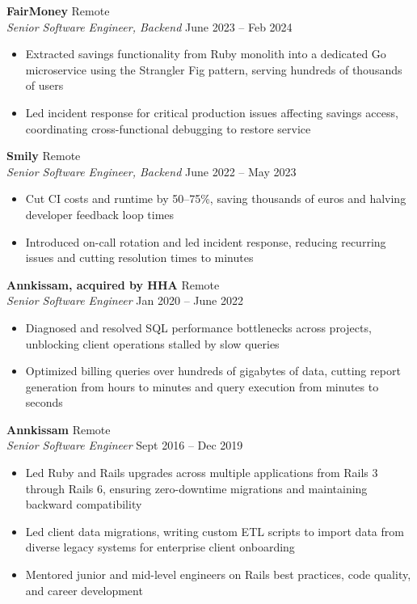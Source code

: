 \documentclass[a4paper, 11pt]{article}
\newcommand{\role}[4]{%
  \vspace{0.5em}
  \needspace{4\baselineskip}%
  \textbf{#1} \hfill \textcolor{light}{#3}\\
  \textit{#2} \hfill \textcolor{light}{#4}\\[0.2em]
}
\begin{document}
\role{FairMoney}{Senior Software Engineer, Backend}{Remote}{June 2023 -- Feb 2024}
\begin{itemize}
  \item Extracted savings functionality from Ruby monolith into a dedicated Go microservice using the Strangler Fig pattern, serving hundreds of thousands of users
  \item Led incident response for critical production issues affecting savings access, coordinating cross-functional debugging to restore service
\end{itemize}

\role{Smily}{Senior Software Engineer, Backend}{Remote}{June 2022 -- May 2023}
\begin{itemize}
  \item Cut CI costs and runtime by 50–75\%, saving thousands of euros and halving developer feedback loop times
  \item Introduced on-call rotation and led incident response, reducing recurring issues and cutting resolution times to minutes
\end{itemize}

\role{Annkissam, acquired by HHA}{Senior Software Engineer}{Remote}{Jan 2020 -- June 2022}
\begin{itemize}
  \item Diagnosed and resolved SQL performance bottlenecks across projects, unblocking client operations stalled by slow queries
  \item Optimized billing queries over hundreds of gigabytes of data, cutting report generation from hours to minutes and query execution from minutes to seconds
\end{itemize}

\role{Annkissam}{Senior Software Engineer}{Remote}{Sept 2016 -- Dec 2019}
\begin{itemize}
  \item Led Ruby and Rails upgrades across multiple applications from Rails 3 through Rails 6, ensuring zero-downtime migrations and maintaining backward compatibility
  \item Led client data migrations, writing custom ETL scripts to import data from diverse legacy systems for enterprise client onboarding
  \item Mentored junior and mid-level engineers on Rails best practices, code quality, and career development
\end{itemize}
\end{document}
